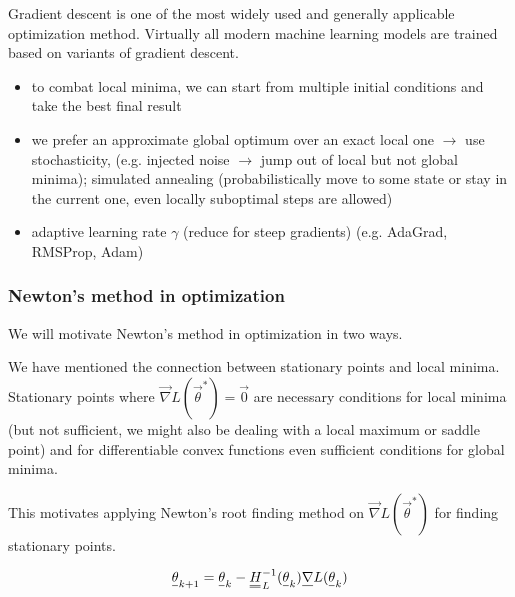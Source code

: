 Gradient descent is one of the most widely used and 
generally applicable optimization method. Virtually all
modern machine learning models are trained based on variants
of gradient descent.


\begin{itemize}
    \item to combat local minima, we can start from multiple initial conditions and take the best final result
    \item we prefer an approximate global optimum over an exact local one $\rightarrow$ use stochasticity, 
    (e.g. injected noise $\rightarrow$ jump out of local but not global minima); simulated annealing (probabilistically 
    move to some state or stay in the current one, even locally suboptimal steps are allowed)
    \item adaptive learning rate $\gamma$ (reduce for steep gradients) (e.g. AdaGrad, RMSProp, Adam)
\end{itemize}

\subsubsection{Newton's method in optimization}

We will motivate Newton's method in optimization in two ways.

We have mentioned the connection between stationary points and local
minima. Stationary points where $\vec{\nabla}L(\vec{\theta}^*) = \vec{0}$
are necessary conditions for local minima
(but not sufficient, we might also be dealing with 
a local maximum or saddle point) and for differentiable convex functions
even sufficient conditions for global minima.

This motivates applying Newton's root finding method on $\vec{\nabla}L(\vec{\theta}^*)$
for finding stationary points.

\begin{equation}
    \vec{\theta}_{k+1} = \vec{\theta}_k - \mat{H}_L^{-1}(\vec{\theta}_k) \vec{\nabla}L(\vec{\theta}_k)
\end{equation}

